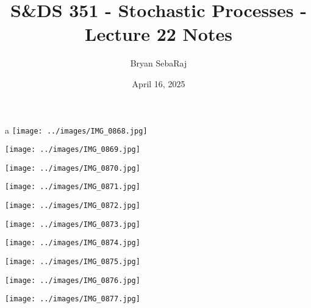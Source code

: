 \documentclass{article}
\title{S\&DS 351 - Stochastic Processes - Lecture 22 Notes}
\author{Bryan SebaRaj}
\date{April 16, 2025}
\begin{document}
\maketitle
a
\texttt{[image: ../images/IMG\_0868.jpg]}

\texttt{[image: ../images/IMG\_0869.jpg]}

\texttt{[image: ../images/IMG\_0870.jpg]}

\texttt{[image: ../images/IMG\_0871.jpg]}

\texttt{[image: ../images/IMG\_0872.jpg]}

\texttt{[image: ../images/IMG\_0873.jpg]}

\texttt{[image: ../images/IMG\_0874.jpg]}

\texttt{[image: ../images/IMG\_0875.jpg]}

\texttt{[image: ../images/IMG\_0876.jpg]}

\texttt{[image: ../images/IMG\_0877.jpg]}
\end{document}
